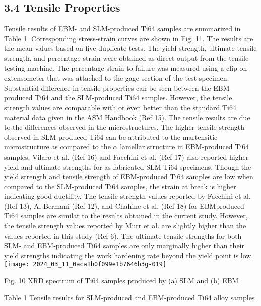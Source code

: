 \documentclass[10pt]{article}
\begin{document}
\subsection*{3.4 Tensile Properties}
Tensile results of EBM- and SLM-produced Ti64 samples are summarized in Table 1. Corresponding stress-strain curves are shown in Fig. 11. The results are the mean values based on five duplicate tests. The yield strength, ultimate tensile strength, and percentage strain were obtained as direct output from the tensile testing machine. The percentage strain-to-failure was measured using a clip-on extensometer that was attached to the gage section of the test specimen. Substantial difference in tensile properties can be seen between the EBM-produced Ti64 and the SLM-produced Ti64 samples. However, the tensile strength values are comparable with or even better than the standard Ti64 material data given in the ASM Handbook (Ref 15). The tensile results are due to the differences observed in the microstructures. The higher tensile strength observed in SLM-produced Ti64 can be attributed to the martensitic microstructure as compared to the $\alpha$ lamellar structure in EBM-produced Ti64 samples. Vilaro et al. (Ref 16) and Facchini et al. (Ref 17) also reported higher yield and ultimate strengths for as-fabricated SLM Ti64 specimens. Though the yield strength and tensile strength of EBM-produced Ti64 samples are low when compared to the SLM-produced Ti64 samples, the strain at break is higher indicating good ductility. The tensile strength values reported by Facchini et al. (Ref 13), Al-Bermani (Ref 12), and Chahine et al. (Ref 18) for EBMproduced Ti64 samples are similar to the results obtained in the current study. However, the tensile strength values reported by Murr et al. are slightly higher than the values reported in this study (Ref 6). The ultimate tensile strengths for both SLM- and EBM-produced Ti64 samples are only marginally higher than their yield strengths indicating the work hardening rate beyond the yield point is low.\\
\texttt{[image: 2024\_03\_11\_0aca1b0f099e1b7646b3g-019]}

Fig. 10 XRD spectrum of Ti64 samples produced by (a) SLM and (b) EBM

Table 1 Tensile results for SLM-produced and EBM-produced Ti64 alloy samples
\end{document}
